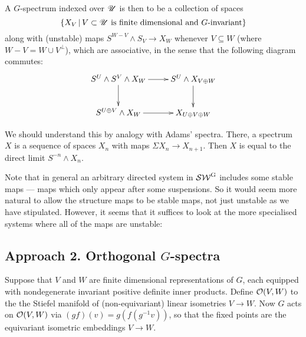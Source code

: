 \documentclass[11pt]{article}
\begin{document}
\begin{FourthWeek}
\begin{defn*}
A $G$-spectrum indexed over $\mathscr{U}$ is then to be a collection of spaces 
\[\{X_V\,|\,V\subset\mathscr{U}\text{ is finite dimensional and $G$-invariant}\}\]
along with (unstable) maps $S^{W-V}\wedge S_V\to X_W$ whenever $V\subseteq W$ (where $W-V=W\cup V^\perp$), which are associative, in the sense that the following diagram commutes:
\[\xymatrix{
\ar[d]S^U\wedge S^V\wedge X_W\ar[r]&S^U\wedge X_{V\oplus W}\ar[d]\\
S^{U\oplus V}\wedge X_W\ar[r]&X_{U\oplus V\oplus W}
}\]
\end{defn*}
We should understand this by analogy with Adams' spectra. There, a spectrum $X$ is a sequence of spaces $X_n$ with maps $\Sigma X_n\to X_{n+1}$. Then $X$ is equal to the direct limit $S^{-n}\wedge X_n$.

Note that in general an arbitrary directed system in $\operatorname{{\mathcal{SW}^G}}$ includes some stable maps --- maps which only appear after some suspensions. So it would seem more natural to allow the structure maps to be stable maps, not just unstable as we have stipulated. However, it seems that it suffices to look at the more specialised systems where all of the maps are unstable:
\subsection*{Approach 2. Orthogonal $G$-spectra}
Suppose that $V$ and $W$ are finite dimensional representations of $G$, each equipped with nondegenerate invariant positive definite inner products. Define $\mathcal{O}(V,W)$ to the the Stiefel manifold of (non-equivariant) linear isometries $V\to W$. Now $G$ acts on $\mathcal{O}(V,W)$ via $(gf)(v)=g(f(g^{-1}v))$, so that the fixed points are the equivariant isometric embeddings $V\to W$.


\end{FourthWeek}
\end{document}
